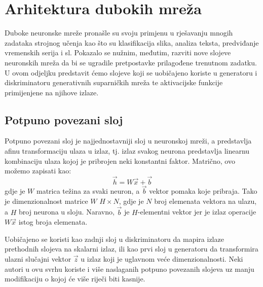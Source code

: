 \section{Arhitektura dubokih mreža}
Duboke neuronske mreže pronašle su svoju primjenu u rješavanju mnogih zadataka strojnog učenja kao što su klasifikacija slika, analiza teksta, predviđanje vremenskih serija i sl. Pokazalo se nužnim, međutim, razviti nove slojeve neuronskih mreža da bi se ugradile pretpostavke prilagođene trenutnom zadatku. U ovom odjeljku predstavit ćemo slojeve koji se uobičajeno koriste u generatoru i diskriminatoru generativnih suparničkih mreža te aktivacijske funkcije primijenjene na njihove izlaze.

\subsection{Potpuno povezani sloj}
Potpuno povezani sloj je najjednostavniji sloj u neuronskoj mreži, a predstavlja afinu transformaciju ulaza u izlaz, tj. izlaz svakog neurona predstavlja linearnu kombinaciju ulaza kojoj je pribrojen neki konstantni faktor. Matrično, ovo možemo zapisati kao:
\begin{equation}
\vec{h} = W\vec{x} + \vec{b}
\end{equation}
gdje je $W$ matrica težina za svaki neuron, a $\vec{b}$ vektor pomaka koje pribraja. Tako je dimenzionalnost matrice $W$ $H \times N$, gdje je $N$ broj elemenata vektora na ulazu, a $H$ broj neurona u sloju. Naravno, $\vec{b}$ je $H$-elementni vektor jer je izlaz operacije $W\vec{x}$ istog broja elemenata.

Uobičajeno se koristi kao zadnji sloj u diskriminatoru da mapira izlaze prethodnih slojeva na skalarni izlaz, ili kao prvi sloj u generatoru da transformira ulazni slučajni vektor $\vec{z}$ u izlaz koji je uglavnom veće dimenzionalnosti. Neki autori  u ovu svrhu koriste i više naslaganih potpuno povezanih slojeva uz manju modifikaciju o kojoj će više riječi biti kasnije.

